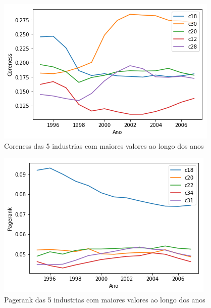 \documentclass[12pt]{article}
\begin{document}
\begin{figure}[H]
	\centering
	\includegraphics[width=\textwidth]{japan_coreness.png}
	\caption{Coreness das 5 industrias com maiores valores ao longo dos anos}
	\label{figura3}
\end{figure}

\begin{figure}[H]
	\centering
	\includegraphics[width=\textwidth]{japan_pagerank.png}
	\caption{Pagerank das 5 industrias com maiores valores ao longo dos anos}
	\label{figura4}
\end{figure}
\end{document}
